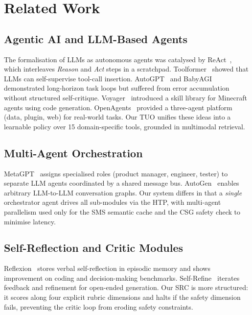 \documentclass[10pt,conference]{IEEEtran}
\theoremstyle{ieeethm}
\theoremstyle{ieeedef}
\theoremstyle{ieeeremark}
\begin{document}
\section{Related Work}
\label{sec:related}

\subsection{Agentic AI and LLM-Based Agents}

The formalisation of LLMs as autonomous agents was catalysed by ReAct~\cite{yao2023react}, which interleaves \emph{Reason} and \emph{Act} steps in a scratchpad. Toolformer~\cite{schick2023toolformer} showed that LLMs can self-supervise tool-call insertion. AutoGPT~\cite{significant2023autogpt} and BabyAGI demonstrated long-horizon task loops but suffered from error accumulation without structured self-critique. Voyager~\cite{wang2023voyager} introduced a skill library for Minecraft agents using code generation. OpenAgents~\cite{xie2023openagents} provided a three-agent platform (data, plugin, web) for real-world tasks. Our TUO unifies these ideas into a learnable policy over 15 domain-specific tools, grounded in multimodal retrieval.

\subsection{Multi-Agent Orchestration}

MetaGPT~\cite{hong2023metagpt} assigns specialised roles (product manager, engineer, tester) to separate LLM agents coordinated by a shared message bus. AutoGen~\cite{wu2023autogen} enables arbitrary LLM-to-LLM conversation graphs. Our system differs in that a \emph{single} orchestrator agent drives all sub-modules via the HTP, with multi-agent parallelism used only for the SMS semantic cache and the CSG safety check to minimise latency.

\subsection{Self-Reflection and Critic Modules}

Reflexion~\cite{shinn2023reflexion} stores verbal self-reflection in episodic memory and shows improvement on coding and decision-making benchmarks. Self-Refine~\cite{madaan2023selfrefine} iterates feedback and refinement for open-ended generation. Our SRC is more structured: it scores along four explicit rubric dimensions and halts if the safety dimension fails, preventing the critic loop from eroding safety constraints.
\end{document}
